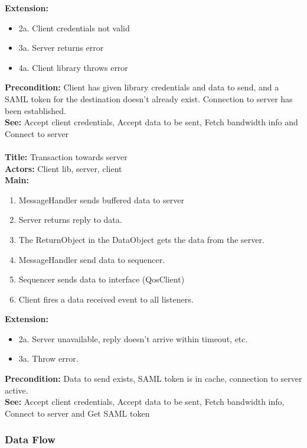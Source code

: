 		\textbf{Extension:}
		\begin{itemize}
	        \item[] 2a. Client credentials not valid
			\item[] 3a. Server returns error
			\item[] 4a. Client library throws error
		\end{itemize}
		\textbf{Precondition:} Client has given library credentials and data to send, and a SAML token for the destination doesn’t already exist. Connection to server has been established. \\
		\textbf{See:} Accept client credentials, Accept data to be sent, Fetch bandwidth info and Connect to server
		\\\\
		\textbf{Title:} Transaction towards server \\
		\textbf{Actors:} Client lib, server, client \\
		\textbf{Main:}
		\begin{enumerate}
			\item MessageHandler sends buffered data to server
			\item Server returns reply to data.
			\item The ReturnObject in the DataObject gets the data from the server.
			\item MessageHandler send data to sequencer.
			\item Sequencer sends data to interface (QosClient)
			\item Client fires a data received event to all listeners.
		\end{enumerate}
		\textbf{Extension:}
		\begin{itemize}
			 \item[] 2a. Server unavailable, reply doesn’t arrive within timeout, etc.
			 \item[] 3a. Throw error.
		\end{itemize}
		\textbf{Precondition:} Data to send exists, SAML token is in cache, connection to server active.\\
		\textbf{See:} Accept client credentials, Accept data to be sent, Fetch bandwidth info, Connect to server and Get SAML token
		
	\subsubsection{Data Flow}\label{textual client data flow}
        
